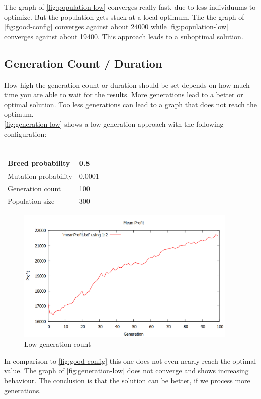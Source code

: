 \documentclass[fontsize=12pt,toc=bibliography, notitlepage]{scrreprt}
\begin{document}
The graph of \autoref{fig:population-low} converges really fast, due to less individuums to optimize. But the population gets stuck at a local optimum. The the graph of \autoref{fig:good-config} converges against about 24000 while \autoref{fig:population-low} converges against about 19400. This approach leads to a suboptimal solution.

\subsection{Generation Count / Duration}
\label{subsec:algorithm-duration}
How high the generation count or duration should be set depends on how much time you are able to wait for the results. More generations lead to a better or optimal solution. Too less generations can lead to a graph that does not reach the optimum. \\
\autoref{fig:generation-low} shows a low generation approach with the following configuration: \\ \\
\begin{tabular}{ |l|l| }
	\hline
	Breed probability & 0.8 \\ \hline
	Mutation probability & 0.0001 \\ \hline
	Generation count & 100 \\ \hline
	Population size & 300 \\ \hline
\end{tabular}
\begin{figure}[H]
	\centering
	\includegraphics[width=400px]{images/generation-low.png}
	\caption{Low generation count}
	\label{fig:generation-low}
\end{figure}
In comparison to \autoref{fig:good-config} this one does not even nearly reach the optimal value. The graph of \autoref{fig:generation-low} does not converge and shows increasing behaviour. The conclusion is that the solution can be better, if we process more generations.

\begin{thebibliography}{999}

\end{thebibliography}

\cleardoublepage
{}
\listoffigures
\end{document}
